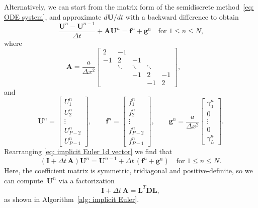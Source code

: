 Alternatively, we can start from the matrix form of the semidiscrete 
method~\eqref{eq: ODE system}, and approximate $d\boldsymbol{U}/dt$ with a 
backward difference to obtain
\begin{equation}\label{eq: implicit Euler 1d vector}
\frac{\boldsymbol{U}^n-\boldsymbol{U}^{n-1}}{\Delta t}
	+\boldsymbol{A}\boldsymbol{U}^n=\boldsymbol{f}^n+\boldsymbol{g}^n
\quad\text{for $1\le n\le N$,}
\end{equation}
where
\[
\boldsymbol{A}=\frac{a}{\Delta x^2}\begin{bmatrix}
 2&    -1&      &      &\\
-1&     2&    -1&      &\\
  &\ddots&\ddots&\ddots&\\
  &      &    -1&     2&-1\\
  &      &      &    -1& 2\end{bmatrix},\qquad
\]
and
\[
\boldsymbol{U}^n=\begin{bmatrix}
U^n_1\\ U^n_2\\ \vdots\\ U^n_{P-2}\\ U^n_{P-1}\end{bmatrix},\qquad
\boldsymbol{f}^n=\begin{bmatrix}
f^n_1\\ f^n_2\\ \vdots\\ f^n_{P-2}\\ f^n_{P-1}\end{bmatrix},\qquad
\boldsymbol{g}^n=\frac{a}{\Delta x^2}\begin{bmatrix}
\gamma_0^n\\ 0\\ \vdots\\ 0\\ \gamma_L^n\end{bmatrix}.
\]
Rearranging \eqref{eq: implicit Euler 1d vector} we find that
\[
(\boldsymbol{I}+\Delta t\,\boldsymbol{A})\boldsymbol{U}^n
	=\boldsymbol{U}^{n-1}+\Delta t\,(\boldsymbol{f}^n+\boldsymbol{g}^n)
\quad\text{for $1\le n\le N$.}
\]
Here, the coefficient matrix is symmetric, tridiagonal and positive-definite, 
so we can compute~$\boldsymbol{U}^n$ via a factorization
\[
\boldsymbol{I}+\Delta t\,\boldsymbol{A}
	=\boldsymbol{L}^T\boldsymbol{D}\boldsymbol{L},
\]
as shown in Algorithm~\ref{alg: implicit Euler}.

